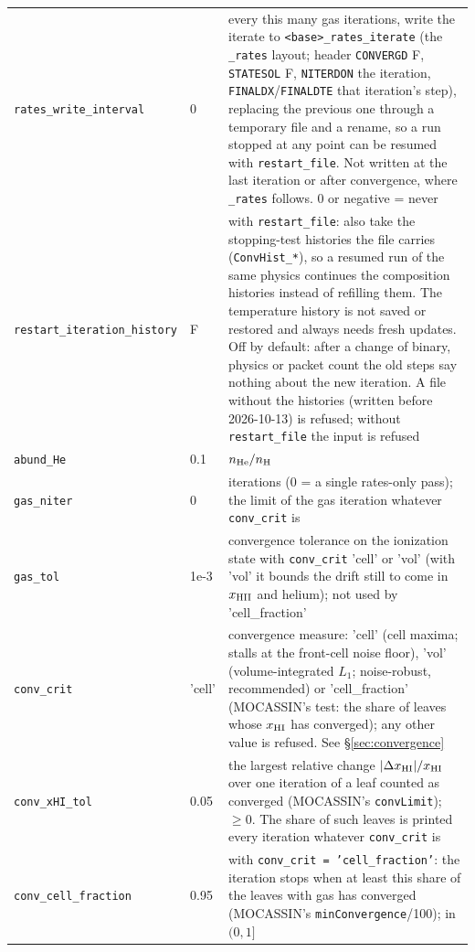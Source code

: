 \documentclass[english,a4paper]{my_memo}
\newcommand{\code}[1]{\texttt{#1}}
\begin{document}
{\begin{longtable}{llp{7.2cm}}
\code{rates\_write\_interval} & 0 & every this many gas iterations, write the iterate to \code{<base>\_rates\_iterate} (the \code{\_rates} layout; header \code{CONVERGD} F, \code{STATESOL} F, \code{NITERDON} the iteration, \code{FINALDX}/\code{FINALDTE} that iteration's step), replacing the previous one through a temporary file and a rename, so a run stopped at any point can be resumed with \code{restart\_file}.  Not written at the last iteration or after convergence, where \code{\_rates} follows.  0 or negative = never \\
\code{restart\_iteration\_history} & F & with \code{restart\_file}: also take the stopping-test histories the file carries (\code{ConvHist\_*}), so a resumed run of the same physics continues the composition histories instead of refilling them.  The temperature history is not saved or restored and always needs fresh updates.  Off by default: after a change of binary, physics or packet count the old steps say nothing about the new iteration.  A file without the histories (written before 2026-10-13) is refused; without \code{restart\_file} the input is refused \\
\code{abund\_He} & 0.1 & $n_{\rm He}/n_{\rm H}$ \\
\code{gas\_niter} & 0 & iterations (0 = a single rates-only pass); the limit of the gas iteration whatever \code{conv\_crit} is \\
\code{gas\_tol} & 1e-3 & convergence tolerance on the ionization state with \code{conv\_crit} 'cell' or 'vol' (with 'vol' it bounds the drift still to come in $x_{\rm HII}$ and helium); not used by 'cell\_fraction' \\
\code{conv\_crit} & 'cell' & convergence measure: 'cell' (cell maxima; stalls at the front-cell noise floor), 'vol' (volume-integrated $L_1$; noise-robust, recommended) or 'cell\_fraction' (MOCASSIN's test: the share of leaves whose $x_{\rm HI}$ has converged); any other value is refused.  See \S\ref{sec:convergence} \\
\code{conv\_xHI\_tol} & 0.05 & the largest relative change $|\Delta x_{\rm HI}|/x_{\rm HI}$ over one iteration of a leaf counted as converged (MOCASSIN's \code{convLimit}); $\ge 0$.  The share of such leaves is printed every iteration whatever \code{conv\_crit} is \\
\code{conv\_cell\_fraction} & 0.95 & with \code{conv\_crit = 'cell\_fraction'}: the iteration stops when at least this share of the leaves with gas has converged (MOCASSIN's \code{minConvergence}/100); in $(0, 1]$ \\

\end{longtable}}
\end{document}
